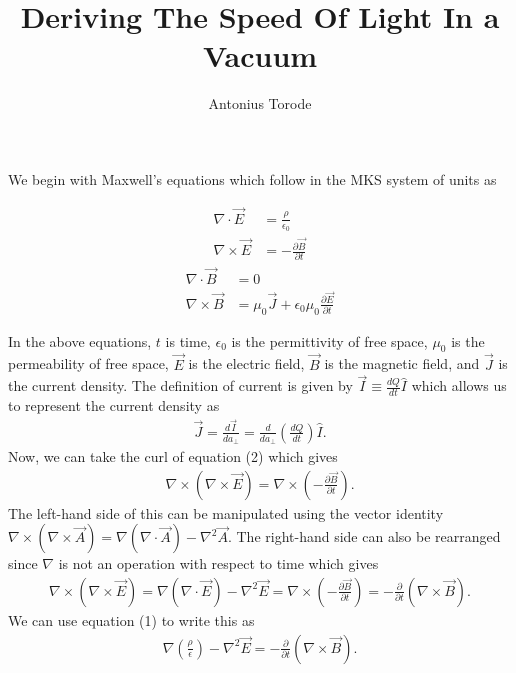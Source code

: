 \documentclass[11pt]{article}
\title{Deriving The Speed Of Light In a Vacuum}
\author{Antonius Torode}
\begin{document}
 

\maketitle

We begin with Maxwell's equations which follow in the MKS system of units \cite{Wolfram} as
\begin{multicols}{2}
	\noindent
	\begin{align}
	\nabla \cdot \vec{E} &= \frac{\rho}{\epsilon_0}\\
	\nabla \times \vec{E} &= -\frac{\partial \vec{B}}{\partial t} 
	\end{align}
	\begin{align}
	\nabla \cdot \vec{B} &= 0 \\
	\nabla \times \vec{B} &= \mu_0\vec{J}+\epsilon_0\mu_0\frac{\partial \vec{E}}{\partial t} 
	\end{align}
\end{multicols}
In the above equations, $t$ is time, $\epsilon_0$ is the permittivity of free space, $\mu_0$ is the permeability of free space, $\vec{E}$ is the electric field, $\vec{B}$ is the magnetic field, and $\vec{J}$ is the current density.  The definition of current is given by $\vec{I} \equiv \frac{dQ}{dt}\hat{I}$ which allows us to represent the current density as
\begin{align}
\vec{J} = \frac{d\vec{I}}{da_\perp} = \frac{d}{da_\perp}\left(\frac{dQ}{dt}\right)\hat{I}. \label{current density}
\end{align} 
Now, we can take the curl of equation (2) which gives
\begin{align}
\nabla \times (\nabla \times \vec{E}) = \nabla \times \left(-\frac{\partial \vec{B}}{\partial t}\right).
\end{align}
The left-hand side of this can be manipulated using the vector identity $\nabla \times (\nabla \times \vec{A}) = \nabla (\nabla \cdot \vec{A})- \nabla^2\vec{A}$. The right-hand side can also be rearranged since $\nabla$ is not an operation with respect to time which gives
\begin{align}
\nabla \times (\nabla \times \vec{E}) = \nabla (\nabla \cdot \vec{E})- \nabla^2\vec{E} = \nabla \times \left(-\frac{\partial \vec{B}}{\partial t}\right) = -\frac{\partial}{\partial t}(\nabla \times \vec{B}).
\end{align}
We can use equation (1) to write this as
\begin{align}
\nabla \left(\frac{\rho}{\epsilon}\right)- \nabla^2\vec{E} = -\frac{\partial}{\partial t}(\nabla \times \vec{B}).
\end{align}
\end{document}
